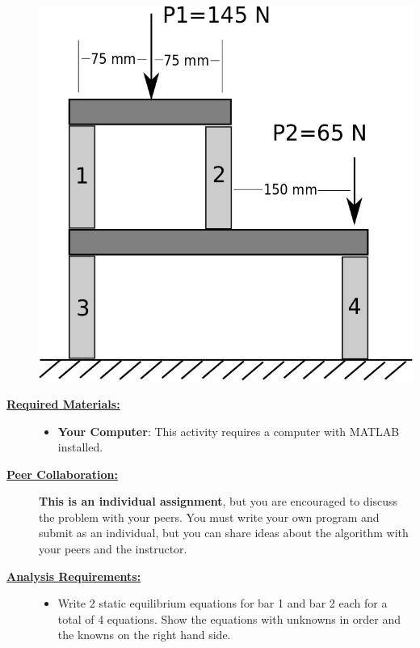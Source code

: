 \documentclass[12pt]{article}
\begin{document}
\begin{description}
	\includegraphics[scale=.25]{activity6_fig1.png}\\
	
	\item[\textbf{\underline{Required Materials:}}] \hfill \vspace{0mm}
	
	\begin{itemize}
		\item {\bf Your Computer}: This activity requires a computer with MATLAB installed.
	\end{itemize}
	
	\item[\textbf{\underline{Peer Collaboration:}}] \hfill \vspace{0mm}
	
	{\bf This is an individual assignment}, but you are encouraged to discuss the problem with your peers. You must write your own program and submit as an individual, but you can share ideas about the algorithm with your peers and the instructor.

\newpage	
\item[\textbf{\underline{Analysis Requirements:}}] \hfill \vspace{0mm}

	
	\begin{itemize}
		
	\item Write 2 static equilibrium equations for bar 1 and bar 2 each for a total of 4 equations. Show the equations with unknowns in order and the knowns on the right hand side.\vspace{10mm} \\
	

\end{itemize}
\end{description}
\end{document}
